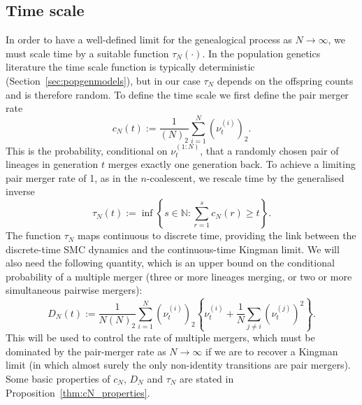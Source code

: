 \subsection{Time scale}
In order to have a well-defined limit for the genealogical process as $N\to\infty$, we must scale time by a suitable function $\tau_N(\cdot)$. In the population genetics literature the time scale function is typically deterministic (Section~\ref{sec:popgenmodels}), but in our case $\tau_N$ depends on the offspring counts and is therefore random.
To define the time scale we first define the pair merger rate
\begin{equation}\label{eq:defn_cN}
c_N(t) := \frac{1}{(N)_2} \sum_{i=1}^N (\nu_t^{(i)})_2 .
\end{equation}
This is the probability, conditional on $\nu_t^{(1:N)}$, that a randomly chosen pair of lineages in generation $t$ merges exactly one generation back.
To achieve a limiting pair merger rate of 1, as in the $n$-coalescent, we rescale time by the generalised inverse
\begin{equation}\label{eq:defn_tauN}
\tau_N(t) := \inf \left\{ s \in \mathbb{N} : \sum_{r=1}^s c_N(r) \geq t \right\} .
\end{equation}
The function $\tau_N$ maps continuous to discrete time, providing the link between the discrete-time SMC dynamics and the continuous-time Kingman limit.
We will also need the following quantity, which is an upper bound on the conditional probability of a multiple merger (three or more lineages merging, or two or more simultaneous pairwise mergers):
\begin{equation}\label{eq:defn_DN}
D_N(t) := \frac{1}{N(N)_2} \sum_{i=1}^N (\nu_t^{(i)})_2
        \left\{ \nu_t^{(i)} + \frac{1}{N} \sum_{j\neq i} (\nu_t^{(j)})^2 \right\} .
\end{equation} 
This will be used to control the rate of multiple mergers, which must be dominated by the pair-merger rate as $N\to\infty$ if we are to recover a Kingman limit (in which almost surely the only non-identity transitions are pair mergers).
Some basic properties of $c_N$, $D_N$ and $\tau_N$ are stated in Proposition~\ref{thm:cN_properties}.
